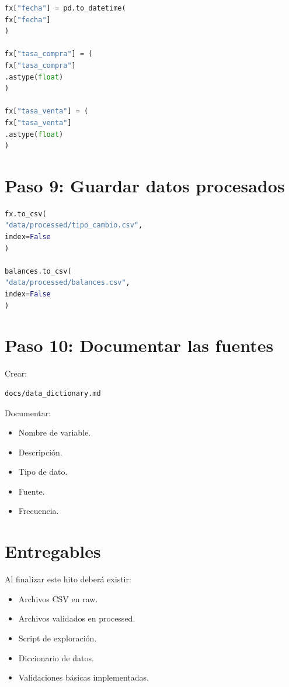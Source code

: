 \begin{lstlisting}[language=Python]
fx["fecha"] = pd.to_datetime(
fx["fecha"]
)

fx["tasa_compra"] = (
fx["tasa_compra"]
.astype(float)
)

fx["tasa_venta"] = (
fx["tasa_venta"]
.astype(float)
)
\end{lstlisting}

\section{Paso 9: Guardar datos procesados}

\begin{lstlisting}[language=Python]
fx.to_csv(
"data/processed/tipo_cambio.csv",
index=False
)

balances.to_csv(
"data/processed/balances.csv",
index=False
)
\end{lstlisting}

\section{Paso 10: Documentar las fuentes}

Crear:

\begin{verbatim}
docs/data_dictionary.md
\end{verbatim}

Documentar:

\begin{itemize}
\item Nombre de variable.
\item Descripción.
\item Tipo de dato.
\item Fuente.
\item Frecuencia.
\end{itemize}

\section{Entregables}

Al finalizar este hito deberá existir:

\begin{itemize}
\item Archivos CSV en raw.
\item Archivos validados en processed.
\item Script de exploración.
\item Diccionario de datos.
\item Validaciones básicas implementadas.
\end{itemize}

